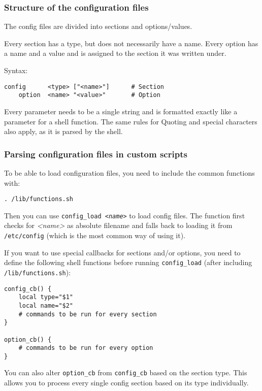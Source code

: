 \subsubsection{Structure of the configuration files}

The config files are divided into sections and options/values.

Every section has a type, but does not necessarily have a name.
Every option has a name and a value and is assigned to the section
it was written under.

Syntax:

\begin{Verbatim}
config      <type> ["<name>"]      # Section
    option  <name> "<value>"       # Option
\end{Verbatim}

Every parameter needs to be a single string and is formatted exactly
like a parameter for a shell function. The same rules for Quoting and
special characters also apply, as it is parsed by the shell.

\subsubsection{Parsing configuration files in custom scripts}

To be able to load configuration files, you need to include the common
functions with:

\begin{Verbatim}
. /lib/functions.sh
\end{Verbatim}

Then you can use \texttt{config\_load \textit{<name>}} to load config files. The function
first checks for \textit{<name>} as absolute filename and falls back to loading
it from \texttt{/etc/config} (which is the most common way of using it).

If you want to use special callbacks for sections and/or options, you
need to define the following shell functions before running \texttt{config\_load}
(after including \texttt{/lib/functions.sh}):

\begin{Verbatim}
config_cb() {
    local type="$1"
    local name="$2"
    # commands to be run for every section
}

option_cb() {
    # commands to be run for every option
}
\end{Verbatim}

You can also alter \texttt{option\_cb} from \texttt{config\_cb} based on the section type.
This allows you to process every single config section based on its type
individually.

